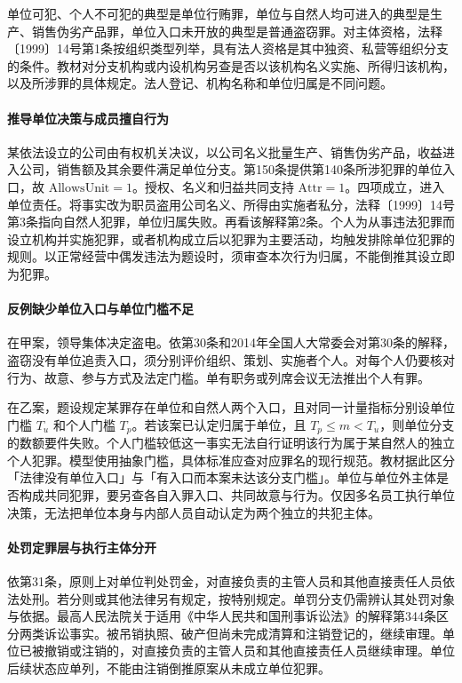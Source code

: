 单位可犯、个人不可犯的典型是单位行贿罪，单位与自然人均可进入的典型是生产、销售伪劣产品罪，单位入口未开放的典型是普通盗窃罪。对主体资格，法释〔1999〕14号第1条按组织类型列举，具有法人资格是其中独资、私营等组织分支的条件。教材对分支机构或内设机构另查是否以该机构名义实施、所得归该机构，以及所涉罪的具体规定。法人登记、机构名称和单位归属是不同问题。

\paragraph{推导\quad 单位决策与成员擅自行为}
某依法设立的公司由有权机关决议，以公司名义批量生产、销售伪劣产品，收益进入公司，销售额及其余要件满足单位分支。第150条提供第140条所涉犯罪的单位入口，故 \(\mathrm{AllowsUnit}=1\)。授权、名义和归益共同支持 \(\mathrm{Attr}=1\)。四项成立，进入单位责任。将事实改为职员盗用公司名义、所得由实施者私分，法释〔1999〕14号第3条指向自然人犯罪，单位归属失败。再看该解释第2条。个人为从事违法犯罪而设立机构并实施犯罪，或者机构成立后以犯罪为主要活动，均触发排除单位犯罪的规则。以正常经营中偶发违法为题设时，须审查本次行为归属，不能倒推其设立即为犯罪。

\paragraph{反例\quad 缺少单位入口与单位门槛不足}
在甲案，领导集体决定盗电。依第30条和2014年全国人大常委会对第30条的解释，盗窃没有单位追责入口，须分别评价组织、策划、实施者个人。对每个人仍要核对行为、故意、参与方式及法定门槛。单有职务或列席会议无法推出个人有罪。

在乙案，题设规定某罪存在单位和自然人两个入口，且对同一计量指标分别设单位门槛 \(T_u\) 和个人门槛 \(T_p\)。若该案已认定归属于单位，且 \(T_p\le m<T_u\)，则单位分支的数额要件失败。个人门槛较低这一事实无法自行证明该行为属于某自然人的独立个人犯罪。模型使用抽象门槛，具体标准应查对应罪名的现行规范。教材据此区分「法律没有单位入口」与「有入口而本案未达该分支门槛」。单位与单位外主体是否构成共同犯罪，要另查各自入罪入口、共同故意与行为。仅因多名员工执行单位决策，无法把单位本身与内部人员自动认定为两个独立的共犯主体。

\paragraph{处罚\quad 定罪层与执行主体分开}
依第31条，原则上对单位判处罚金，对直接负责的主管人员和其他直接责任人员依法处刑。若分则或其他法律另有规定，按特别规定。单罚分支仍需辨认其处罚对象与依据。最高人民法院关于适用《中华人民共和国刑事诉讼法》的解释第344条区分两类诉讼事实。被吊销执照、破产但尚未完成清算和注销登记的，继续审理。单位已被撤销或注销的，对直接负责的主管人员和其他直接责任人员继续审理。单位后续状态应单列，不能由注销倒推原案从未成立单位犯罪。

